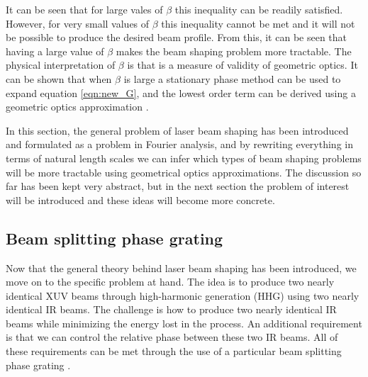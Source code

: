 It can be seen that for large vales of $\beta$ this inequality can be readily satisfied. However, for very small values of $\beta$ this inequality cannot be met and it will not be possible to produce the desired beam profile.  From this, it can be seen that having a large value of $\beta$ makes the beam shaping problem more tractable.  The physical interpretation of $\beta$ is that is a measure of validity of geometric optics.  It can be shown that when $\beta$ is large a stationary phase method can be used to expand equation \ref{eqn:new_G}, and the lowest order term can be derived using a geometric optics approximation \cite{dickeyLaserBeamShaping2000, romeroMathematicalAspectsLaser2010}.

In this section, the general problem of laser beam shaping has been introduced and formulated as a problem in Fourier analysis, and by rewriting everything in terms of natural length scales we can infer which types of beam shaping problems will be more tractable using geometrical optics approximations.  The discussion so far has been kept very abstract, but in the next section the problem of interest will be introduced and these ideas will become more concrete.

\subsection{Beam splitting phase grating}
\label{sec:phase_grating}
Now that the general theory behind laser beam shaping has been introduced, we move on to the specific problem at hand.  The idea is to produce two nearly identical XUV beams through high-harmonic generation (HHG) using two nearly identical IR beams.  The challenge is how to produce two nearly identical IR beams while minimizing the energy lost in the process.  An additional requirement is that we can control the relative phase between these two IR beams.  All of these requirements can be met through the use of a particular beam splitting phase grating \cite{camperHighRelativephasePrecision2019, romeroTheoryOptimalBeam2007, alberoGeneralizedDiffractiveOptical2013, romeroMathematicalTheoryLaser2010}.

